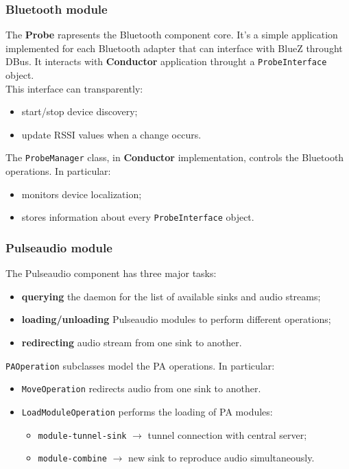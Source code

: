 \documentclass{beamer}
\begin{document}
\begin{frame}
\frametitle{Bluetooth module}
The \textbf{Probe} rapresents the Bluetooth component core. It's a simple application implemented for each Bluetooth adapter that can interface with BlueZ throught DBus. It interacts with \textbf{Conductor} application throught a \texttt{ProbeInterface} object.\\ This interface can transparently:
\begin{itemize}
	\item start/stop device discovery;
	\item update RSSI values when a change occurs.
\end{itemize}
The \texttt{ProbeManager} class, in \textbf{Conductor} implementation, controls the Bluetooth operations. In particular:
\begin{itemize}
	\item monitors device localization;
	\item stores information about every \texttt{ProbeInterface} object.
\end{itemize}
\end{frame}

\begin{frame}
\frametitle{Pulseaudio module}
The Pulseaudio component has three major tasks:
\begin{itemize}
	\item \textbf{querying} the daemon for the list of available sinks and audio streams;
	\item \textbf{loading/unloading} Pulseaudio modules to perform different operations;
	\item \textbf{redirecting} audio stream from one sink to another.
\end{itemize}
\texttt{PAOperation} subclasses model the PA operations. In particular: \\
\begin{itemize}
	\item \texttt{MoveOperation} redirects audio from one sink to another.
	\item \texttt{LoadModuleOperation} performs the loading of PA modules:
		\begin{itemize}
			\item \texttt{module-tunnel-sink} $\rightarrow$ tunnel connection with central server;
			\item \texttt{module-combine} $\rightarrow$ new sink to reproduce audio simultaneously.
		\end{itemize}
	\end{itemize}
\end{frame}
\end{document}
